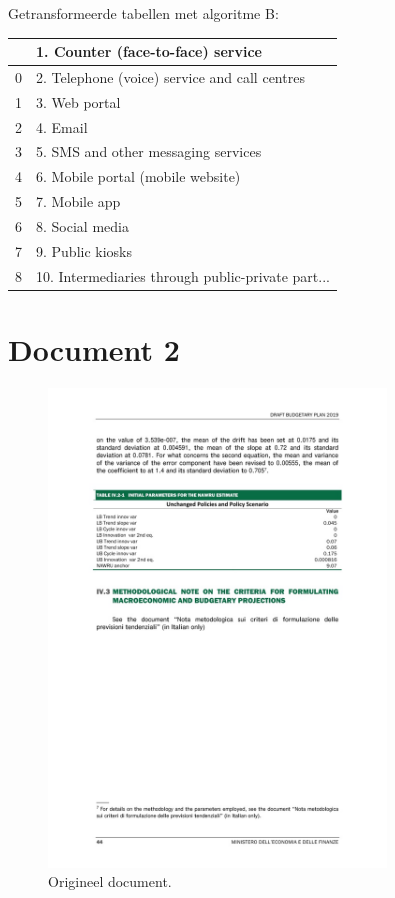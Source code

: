 Getransformeerde tabellen met algoritme B:

\begin{tabular}{ll}
\toprule
{} &                  1. Counter (face-to-face) service \\
\midrule
0 &      2. Telephone (voice) service and call centres \\
1 &                                      3. Web portal \\
2 &                                           4. Email \\
3 &                5. SMS and other messaging services \\
4 &                  6. Mobile portal (mobile website) \\
5 &                                      7. Mobile app \\
6 &                                    8. Social media \\
7 &                                   9. Public kiosks \\
8 &  10. Intermediaries through public-private part... \\
\bottomrule
\end{tabular}

\section{Document 2}

\begin{figure}[H]
    \centering
    \includegraphics[width=0.8\textwidth]{test-resultaten/2/original.jpg}
    \caption{Origineel document.}
\end{figure}

